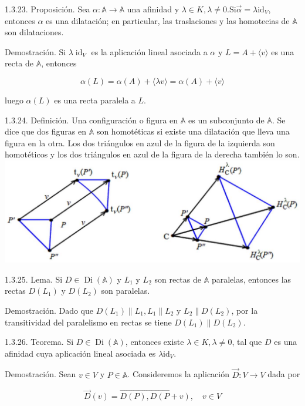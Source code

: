 \documentclass[12pt, a4paper, ones, notitlepage, openany,titlepage]{article}
\begin{document}
1.3.23. Proposición. Sea $\alpha: \mathbb{A} \rightarrow \mathbb{A}$ una afinidad y $\lambda \in K, \lambda \neq 0 . \mathrm{Si} \vec{\alpha}=\lambda \mathrm{id}_{V}$, entonces $\alpha$ es una dilatación; en particular, las traslaciones y las homotecias de $\mathbb{A}$ son dilataciones.

Demostración. Si $\lambda \operatorname{id}_{V}$ es la aplicación lineal asociada a $\alpha$ y $L=A+\langle v\rangle$ es una recta de $\mathbb{A}$, entonces

$$
\alpha(L)=\alpha(A)+\langle\lambda v\rangle=\alpha(A)+\langle v\rangle
$$

luego $\alpha(L)$ es una recta paralela a $L$.

1.3.24. Definición. Una configuración o figura en $\mathbb{A}$ es un subconjunto de $\mathbb{A}$. Se dice que dos figuras en $\mathbb{A}$ son homotéticas si existe una dilatación que lleva una figura en la otra. Los dos triángulos en azul de la figura de la izquierda son homotéticos y los dos triángulos en azul de la figura de la derecha también lo son.
\includegraphics[max width=\textwidth, center]{2023_03_01_7659aec5e35f9a9b2d3cg-30}

1.3.25. Lema. Si $D \in \operatorname{Di}(\mathbb{A})$ y $L_{1}$ y $L_{2}$ son rectas de $\mathbb{A}$ paralelas, entonces las rectas $D\left(L_{1}\right)$ y $D\left(L_{2}\right)$ son paralelas.

Demostración. Dado que $D\left(L_{1}\right)\left\|L_{1}, L_{1}\right\| L_{2}$ y $L_{2} \| D\left(L_{2}\right)$, por la transitividad del paralelismo en rectas se tiene $D\left(L_{1}\right) \| D\left(L_{2}\right)$.

1.3.26. Teorema. Si $D \in \operatorname{Di}(\mathbb{A})$, entonces existe $\lambda \in K, \lambda \neq 0$, tal que $D$ es una afinidad cuya aplicación lineal asociada es $\lambda \mathrm{id}_{V}$.

Demostración. Sean $v \in V$ y $P \in \mathbb{A}$. Consideremos la aplicación $\vec{D}: V \rightarrow V$ dada por

$$
\vec{D}(v)=\overrightarrow{D(P), D(P+v)}, \quad v \in V
$$
\end{document}
